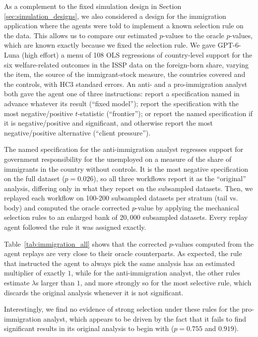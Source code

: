 \documentclass[10pt]{article}
\begin{document}
As a complement to the fixed simulation design in Section \ref{sec:simulation_designs}, we also considered a design for the immigration application where the agents were told to implement a known selection rule on the data. This allows us to compare our estimated $p$-values to the oracle $p$-values, which are known exactly because we fixed the selection rule.  We gave GPT-6-Luna (high effort) a menu of 108 OLS regressions of country-level support for the six welfare-related outcomes in the ISSP data on the foreign-born share, varying the item, the source of the immigrant-stock measure, the countries covered and the controls, with HC3 standard errors. An anti- and a pro-immigration analyst both gave the agent one of three instructions: report a specification named in advance whatever its result (``fixed model''); report the specification with the most negative/positive $t$-statistic (``frontier''); or report the named specification if it is negative/positive and significant, and otherwise report the most negative/positive alternative (``client pressure'').

The named specification for the anti-immigration analyst regresses support for government responsibility for the unemployed on a measure of the share of immigrants in the country without controls. It is the most negative specification on the full dataset ($p = 0.026$), so all three workflows report it as the ``original'' analysis, differing only in what they report on the subsampled datasets. Then, we replayed each workflow on 100-200 subsampled datasets per stratum (tail vs. body) and computed the oracle corrected $p$-value by applying the mechanical selection rules to an enlarged bank of $20{,}000$ subsampled datasets. Every replay agent followed the rule it was assigned exactly.

Table~\ref{tab:immigration_all} shows that the corrected $p$-values computed from the agent replays are very close to their oracle counterparts. As expected, the rule that instructed the agent to always pick the same analysis has an estimated multiplier of exactly $1$, while for the anti-immigration analyst, the other rules estimate $\lambda$s larger than $1$, and more strongly so for the most selective rule, which discards the original analysis whenever it is not significant.

Interestingly, we find no evidence of strong selection under these rules for the pro-immigration analyst, which appears to be driven by the fact that it fails to find significant results in its original analysis to begin with ($p=0.755$ and $0.919$).
\end{document}

